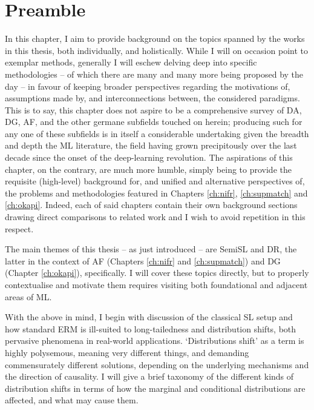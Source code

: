 \section*{Preamble}
\noindent
%
In this chapter, I aim to provide background on the topics spanned by the works in this thesis,
both individually, and holistically.
%
While I will on occasion point to exemplar methods, generally I will eschew delving deep into
specific methodologies -- of which there are many and many more being proposed by the day -- in
favour of keeping broader perspectives regarding the motivations of, assumptions made by, and
interconnections between, the considered paradigms. 
%
This is to say, this chapter does not aspire to be a comprehensive survey of \ac{DA}, \ac{DG},
\ac{AF}, and the other germane subfields touched on herein; producing such for any one of these
subfields is in itself a considerable undertaking given the breadth and depth the \ac{ML}
literature, the field having grown precipitously over the last decade since the onset of the
deep-learning revolution.
%
The aspirations of this chapter, on the contrary, are much more humble, simply being to provide the
requisite (high-level) background for, and unified and alternative perspectives of, the problems
and methodologies featured in Chapters \ref{ch:nifr}, \ref{ch:supmatch} and \ref{ch:okapi}.
%
Indeed, each of said chapters contain their own background sections drawing direct comparisons to
related work and I wish to avoid repetition in this respect.

The main themes of this thesis -- as just introduced -- are \ac{SemiSL} and \ac{DR}, the latter in
the context of \ac{AF} (Chapters \ref{ch:nifr} and \ref{ch:supmatch}) and \ac{DG} (Chapter
\ref{ch:okapi}), specifically. 
%
I will cover these topics directly, but to properly contextualise and motivate them requires
visiting both foundational and adjacent areas of \ac{ML}.

%
With the above in mind, I begin with discussion of the classical \ac{SL} setup and how standard
\ac{ERM} is ill-suited to long-tailedness and distribution shifts, both pervasive phenomena in
real-world applications. 
%
`Distributions shift' as a term is highly polysemous, meaning very different things, and demanding
commensurately different solutions, depending on the underlying mechanisms and the direction of
causality. 
%
I will give a brief taxonomy of the different kinds of distribution shifts in terms of how the
marginal and conditional distributions are affected, and what may cause them. 

